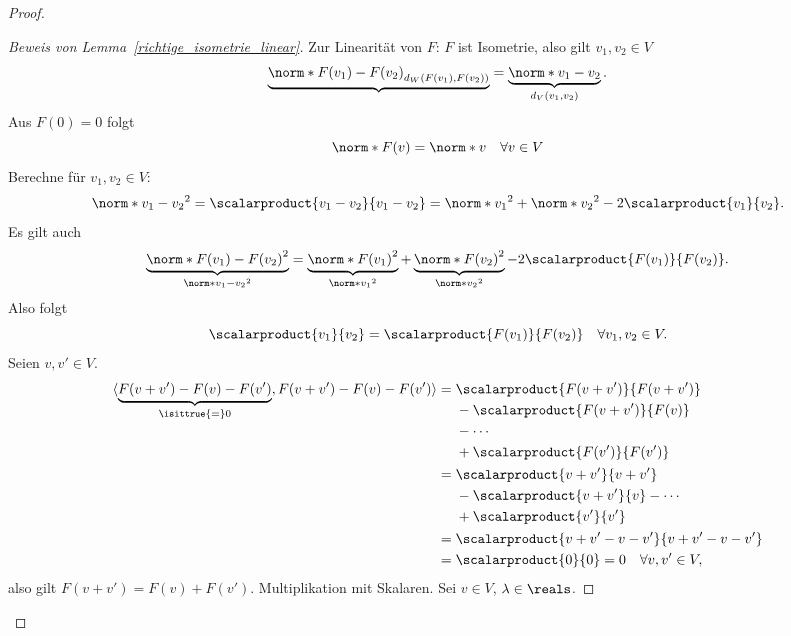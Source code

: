 \begin{proof}
\begin{proof}[Beweis von Lemma~\ref{richtige_isometrie_linear}]
    Zur Linearität von \( F \): \( F \) ist Isometrie, also gilt \tforall \( v_1,v_2\in V \)
    \begin{equation*}
      \underbrace{\norm*{F(v_1)-F(v_2)}_{d_W(F(v_1),F(v_2))}}=\underbrace{\norm*{v_1-v_2}}_{d_V(v_1,v_2)}.
    \end{equation*}
    Aus \( F(0)=0 \) folgt
    \begin{equation*}
      \norm*{F(v)}=\norm*{v}\quad \forall v\in V
    \end{equation*}
    Berechne für \( v_1,v_2\in V \):
    \begin{equation*}
      \norm*{v_1-v_2}^2=\scalarproduct{v_1-v_2}{v_1-v_2}=\norm*{v_1}^2+\norm*{v_2}^2-2\scalarproduct{v_1}{v_2}.
    \end{equation*}
    Es gilt auch
    \begin{equation*}
      \underbrace{\norm*{F(v_1)-F(v_2)}^2}_{\norm*{v_1-v_2}^2}=\underbrace{\norm*{F(v_1)}^2}_{\norm*{v_1}^2}+\underbrace{\norm*{F(v_2)}^2}_{\norm*{v_2}^2}-2\scalarproduct{F(v_1)}{F(v_2)}.
    \end{equation*}
    Also folgt
    \begin{equation*}
      \scalarproduct{v_1}{v_2}=\scalarproduct{F(v_1)}{F(v_2)}\quad \forall v_1,v_2\in V.
    \end{equation*}
    Seien \( v,v'\in V \).
    \begin{align*}
      \langle \underbrace{F(v+v')-F(v)-F(v')}_{\isittrue{=}0},F(v+v')-F(v)-F(v')\rangle&=\begin{aligned}[t]
        &\scalarproduct{F(v+v')}{F(v+v')}\\
        &-\scalarproduct{F(v+v')}{F(v)}\\
        &-\dotsb\\
        &+\scalarproduct{F(v')}{F(v')}
      \end{aligned}\\
      &=\begin{aligned}[t]
        &\scalarproduct{v+v'}{v+v'}\\
        &-\scalarproduct{v+v'}{v}-\dotsb\\
        &+\scalarproduct{v'}{v'}
      \end{aligned}\\
      &=\scalarproduct{v+v'-v-v'}{v+v'-v-v'} \\
      &=\scalarproduct{0}{0}=0\quad \forall v,v'\in V,
    \end{align*}
    also gilt \( F(v+v')=F(v)+F(v') \). Multiplikation mit Skalaren. Sei \( v\in V \), \( \lambda\in \reals \).

\end{proof}
\end{proof}
